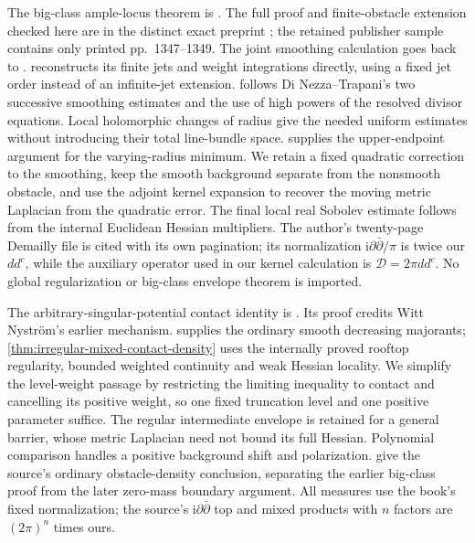 The big-class ample-locus theorem is \cite[Theorem 1.1, pp.~1347--1349]{DNT23}. The full proof and finite-obstacle extension checked here are in the distinct exact preprint \cite[Lemmas 3.1, 3.3--3.5, Section 4 and Theorem 4.2, pp.~3--19]{DNT2023v3}; the retained publisher sample contains only printed pp.~1347--1349. The joint smoothing calculation goes back to \cite[Proposition 2.9, pp.~5--6, Proposition 3.8, pp.~8--12, and Theorem 4.1, pp.~12--16]{DemFlowOnline}.  reconstructs its finite jets and weight integrations directly, using a fixed jet order instead of an infinite-jet extension.  follows Di Nezza--Trapani's two successive smoothing estimates and the use of high powers of the resolved divisor equations. Local holomorphic changes of radius give the needed uniform estimates without introducing their total line-bundle space.  supplies the upper-endpoint argument for the varying-radius minimum. We retain a fixed quadratic correction to the smoothing, keep the smooth background separate from the nonsmooth obstacle, and use the adjoint kernel expansion to recover the moving metric Laplacian from the quadratic error. The final local real Sobolev estimate follows from the internal Euclidean Hessian multipliers. The author's twenty-page Demailly file is cited with its own pagination; its normalization $\mathrm i\partial\bar\partial/\pi$ is twice our $dd^c$, while the auxiliary operator used in our kernel calculation is $\mathcal D=2\pi dd^c$. No global regularization or big-class envelope theorem is imported.

The arbitrary-singular-potential contact identity is \cite[Theorem 3.2 and complete proof, pp.~5--8]{DNT2019v1}. Its proof credits Witt Nystr\"om's earlier mechanism.  supplies the ordinary smooth decreasing majorants; \cref{thm:irregular-mixed-contact-density} uses the internally proved rooftop regularity, bounded weighted continuity and weak Hessian locality. We simplify the level-weight passage by restricting the limiting inequality to contact and cancelling its positive weight, so one fixed truncation level and one positive parameter suffice. The regular intermediate envelope is retained for a general barrier, whose metric Laplacian need not bound its full Hessian. Polynomial comparison handles a positive background shift and polarization.  give the source's ordinary obstacle-density conclusion, separating the earlier big-class proof from the later zero-mass boundary argument. All measures use the book's fixed normalization; the source's $\mathrm i\partial\bar\partial$ top and mixed products with $n$ factors are $(2\pi)^n$ times ours.

